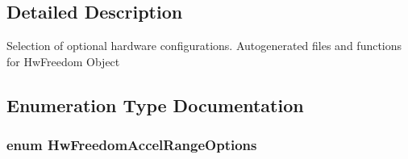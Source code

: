 \subsection{\-Detailed \-Description}
\-Selection of optional hardware configurations. \-Autogenerated files and functions for \-Hw\-Freedom \-Object 

\subsection{\-Enumeration \-Type \-Documentation}
\hypertarget{group___hw_freedom_ga9d5f897ec64e24063ed5d297ec3ac65e}{
\subsubsection[{\-Hw\-Freedom\-Accel\-Range\-Options}]{\setlength{\rightskip}{0pt plus 5cm}enum {\bf \-Hw\-Freedom\-Accel\-Range\-Options}}}\label{group___hw_freedom_ga9d5f897ec64e24063ed5d297ec3ac65e}
